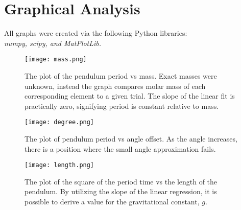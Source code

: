 \documentclass{article}
\begin{document}
\clearpage
\section{Graphical Analysis}

All graphs were created via the following Python libraries:\\

\textit{numpy, scipy, and MatPlotLib.}\\

\begin{figure}[h]
  \texttt{[image: mass.png]}
  \caption{The plot of the pendulum period vs mass. Exact masses were unknown, instead the graph
  compares molar mass of each corresponding element to a given trial.  The slope of the linear fit
  is practically zero, signifying period is constant relative to mass.}
  \label{fig:group}
\end{figure}


\begin{figure}[h]
  \texttt{[image: degree.png]}
  \caption{The plot of pendulum period vs angle offset. As the angle increases, there is a position
  where the small angle approximation fails.}
  \label{fig:class}
\end{figure}

\begin{figure}[h]
  \texttt{[image: length.png]}
  \caption{The plot of the square of the period time vs the length of the pendulum.  By utilizing
  the slope of the linear regression, it is possible to derive a value for the gravitational constant,
  $g$.}
  \label{fig:both}
\end{figure}

%
\end{document}
